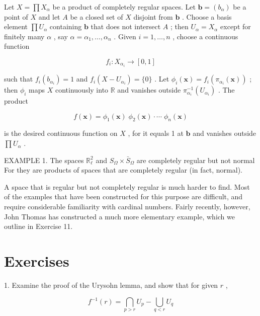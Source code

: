 Let \(X = \prod {X}_{\alpha }\) be a product of completely regular spaces. Let \(\mathbf{b} = \left( {b}_{\alpha }\right)\) be a point of \(X\) and let \(A\) be a closed set of \(X\) disjoint from \(\mathbf{b}\) . Choose a basis element \(\prod {U}_{\alpha }\) containing \(\mathbf{b}\) that does not intersect \(A\) ; then \({U}_{\alpha } = {X}_{\alpha }\) except for finitely many \(\alpha\) , say \(\alpha  = {\alpha }_{1},\ldots ,{\alpha }_{n}\) . Given \(i = 1,\ldots ,n\) , choose a continuous function

\[
{f}_{i} : {X}_{{\alpha }_{i}} \rightarrow  \left\lbrack  {0,1}\right\rbrack
\]

such that \({f}_{i}\left( {b}_{{\alpha }_{i}}\right)  = 1\) and \({f}_{i}\left( {X - {U}_{{\alpha }_{i}}}\right)  = \{ 0\}\) . Let \({\phi }_{i}\left( \mathbf{x}\right)  = {f}_{i}\left( {{\pi }_{{\alpha }_{i}}\left( \mathbf{x}\right) }\right)\) ; then \({\phi }_{i}\) maps \(X\) continuously into \(\mathbb{R}\) and vanishes outside \({\pi }_{{\alpha }_{i}}^{-1}\left( {U}_{{\alpha }_{i}}\right)\) . The product

\[
f\left( \mathbf{x}\right)  = {\phi }_{1}\left( \mathbf{x}\right) \;{\phi }_{2}\left( \mathbf{x}\right)  \cdot  \cdots \;{\phi }_{n}\left( \mathbf{x}\right)
\]

is the desired continuous function on \(X\) , for it equals 1 at \(\mathbf{b}\) and vanishes outside \(\prod {U}_{\alpha }\) .

EXAMPLE 1. The spaces \({\mathbb{R}}_{\ell }^{2}\) and \({S}_{\Omega } \times  {\bar{S}}_{\Omega }\) are completely regular but not normal For they are products of spaces that are completely regular (in fact, normal).

A space that is regular but not completely regular is much harder to find. Most of the examples that have been constructed for this purpose are difficult, and require considerable familiarity with cardinal numbers. Fairly recently, however, John Thomas 		\cite{Thomas1969} has constructed a much more elementary example, which we outline in Exercise 11.

\section*{Exercises}

1. Examine the proof of the Urysohn lemma, and show that for given \(r\) ,

\[
{f}^{-1}\left( r\right)  = \mathop{\bigcap }\limits_{{p > r}}{U}_{p} - \mathop{\bigcup }\limits_{{q < r}}{U}_{q}
\]

